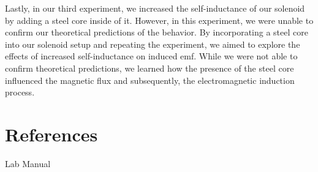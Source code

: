 \documentclass[11pt]{article}
\let\oldsection\section
\renewcommand\section{\clearpage\oldsection}
\begin{document}
    Lastly, in our third experiment, we increased the self-inductance of our solenoid by adding a steel core inside of it. However, in this experiment, we were unable to confirm our theoretical predictions of the behavior. By incorporating a steel core into our solenoid setup and repeating the experiment, we aimed to explore the effects of increased self-inductance on induced emf. While we were not able to confirm theoretical predictions, we learned how the presence of the steel core influenced the magnetic flux and subsequently, the electromagnetic induction process.


    \appendix
    \section{References}\label{sec:references}

    Lab Manual
\end{document}

